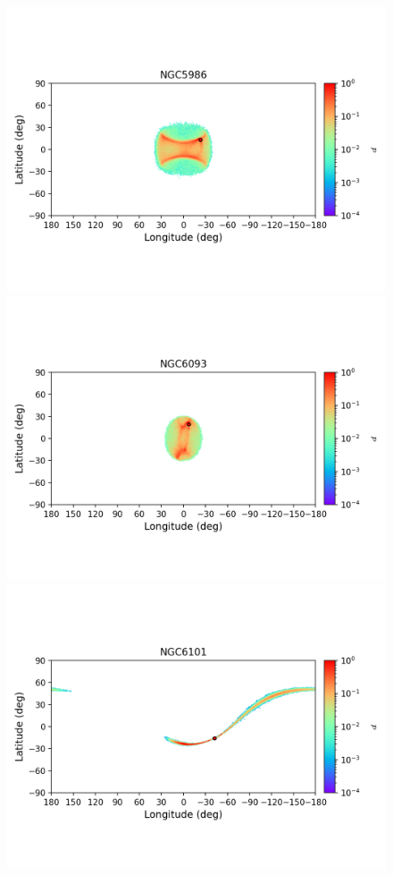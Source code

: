 \begin{figure}
        \includegraphics[clip=true, trim = 0mm 20mm 0mm 10mm, width=1\columnwidth]{images/error_plots_NGC5986.png}
        \includegraphics[clip=true, trim = 0mm 20mm 0mm 10mm, width=1\columnwidth]{images/error_plots_NGC6093.png}
        \includegraphics[clip=true, trim = 0mm 20mm 0mm 10mm, width=1\columnwidth]{images/error_plots_NGC6101.png}

\end{figure}
